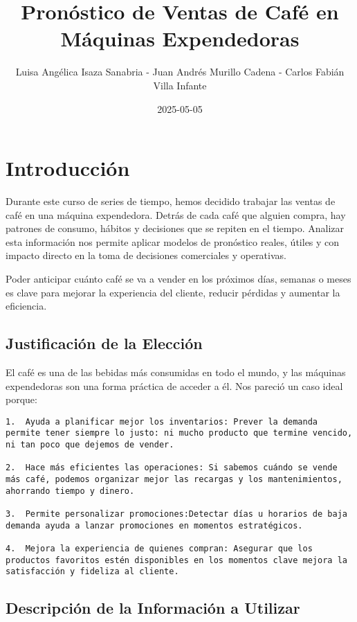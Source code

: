 \documentclass[
]{book}
\title{Pronóstico de Ventas de Café en Máquinas Expendedoras}
\author{Luisa Angélica Isaza Sanabria - Juan Andrés Murillo Cadena -
Carlos Fabián Villa Infante}
\date{2025-05-05}
\begin{document}
\frontmatter
\maketitle

\mainmatter
\chapter{Introducción}\label{introducciuxf3n}

Durante este curso de series de tiempo, hemos decidido trabajar las
ventas de café en una máquina expendedora. Detrás de cada café que
alguien compra, hay patrones de consumo, hábitos y decisiones que se
repiten en el tiempo. Analizar esta información nos permite aplicar
modelos de pronóstico reales, útiles y con impacto directo en la toma de
decisiones comerciales y operativas.

Poder anticipar cuánto café se va a vender en los próximos días, semanas
o meses es clave para mejorar la experiencia del cliente, reducir
pérdidas y aumentar la eficiencia.

\section{Justificación de la
Elección}\label{justificaciuxf3n-de-la-elecciuxf3n}

El café es una de las bebidas más consumidas en todo el mundo, y las
máquinas expendedoras son una forma práctica de acceder a él. Nos
pareció un caso ideal porque:

\begin{verbatim}
1.  Ayuda a planificar mejor los inventarios: Prever la demanda permite tener siempre lo justo: ni mucho producto que termine vencido, ni tan poco que dejemos de vender.

2.  Hace más eficientes las operaciones: Si sabemos cuándo se vende más café, podemos organizar mejor las recargas y los mantenimientos, ahorrando tiempo y dinero.

3.  Permite personalizar promociones:Detectar días u horarios de baja demanda ayuda a lanzar promociones en momentos estratégicos.

4.  Mejora la experiencia de quienes compran: Asegurar que los productos favoritos estén disponibles en los momentos clave mejora la satisfacción y fideliza al cliente.
\end{verbatim}

\section{Descripción de la Información a
Utilizar}\label{descripciuxf3n-de-la-informaciuxf3n-a-utilizar}
\end{document}
